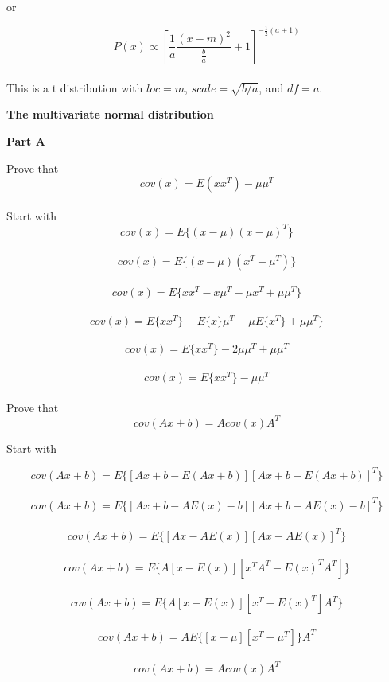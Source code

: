 \documentclass[12pt]{amsart}
\begin{document}
or

$$P(x) \propto \left[\frac{1}{a}\frac{(x-m)^2}{\frac{b}{a}}+1\right]^{-\frac{1}{2}(a+1)}$$\\

This is a t distribution with $loc=m$,  $scale=\sqrt{b/a
}$, and $df=a$.

\newpage
{\large \bf The multivariate normal distribution}
\bigskip
\bigskip

{\bf Part A}\\
\bigskip

Prove that 
$$cov(x)=E(xx^T)-\mu\mu^T$$\\

Start with \\

$$cov(x)=E\{(x-\mu)(x-\mu)^T\}$$\\


$$cov(x)=E\{(x-\mu)(x^T-\mu^T)\}$$\\

$$cov(x)=E\{xx^T-x\mu^T-\mu x^T+\mu\mu^T\}$$\\

$$cov(x)=E\{xx^T\} -E\{x\}\mu^T -\mu E\{x^T\}+\mu\mu^T\}$$\\



$$cov(x)=E\{xx^T\}-2\mu \mu^T+\mu\mu^T $$\\

$$cov(x)=E\{xx^T\}-\mu\mu^T$$\\


Prove that\\

$$cov(Ax+b) = Acov(x)A^T $$

Start with

$$cov(Ax+b) = E\{[Ax+b-E(Ax+b)][Ax+b-E(Ax+b)]^T\}$$\\


$$cov(Ax+b) = E\{[Ax+b-AE(x)-b][Ax+b-AE(x)-b]^T\}$$\\

$$cov(Ax+b) = E\{[Ax-AE(x)][Ax-AE(x)]^T\}$$\\

$$cov(Ax+b) = E\{A[x-E(x)] [x^TA^T-E(x)^TA^T]\}$$\\

$$cov(Ax+b) = E\{A[x-E(x)] [x^T-E(x)^T]A^T\}$$\\

$$cov(Ax+b) = AE\{[x-\mu] [x^T-\mu^T]\}A^T$$\\

$$cov(Ax+b) = Acov(x)A^T$$\\
\end{document}

